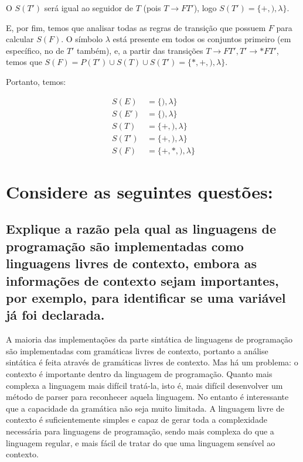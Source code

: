 \documentclass{article}
\begin{document}
O $S(T')$ será igual ao seguidor de $T$ (pois $T \rightarrow FT'$), logo $S(T') = \{+, ), \lambda\}$.

E, por fim, temos que analisar todas as regras de transição que possuem $F$ para calcular $S(F)$. O símbolo $\lambda$ está presente em todos os conjuntos primeiro (em específico, no de $T'$ também), e, a partir das transições $T \rightarrow FT', T' \rightarrow *FT'$, temos que $S(F) = P(T') \cup S(T) \cup S(T') = \{*,+,),\lambda\}$.
	
Portanto, temos:

\begin{align*}
	S(E) &= \{ ), \lambda            \}\\
	S(E') &= \{  ), \lambda       \}\\
	S(T) &= \{ +, ), \lambda     \}\\
	S(T') &= \{   +, ), \lambda                    \}\\
	S(F) &= \{ +, *, ), \lambda      \}
\end{align*}

\newpage
\section{Considere as seguintes questões:}

\subsection{Explique a razão pela qual as linguagens de programação são implementadas como linguagens
livres de contexto, embora as informações de contexto sejam importantes, por exemplo, para
identificar se uma variável já foi declarada.}

A maioria das implementações da parte sintática de linguagens de programação são implementadas com gramáticas livres de contexto, portanto a análise sintática é feita através de gramáticas livres de contexto. Mas há um problema: o contexto é importante dentro da linguagem de programação. Quanto mais complexa a linguagem mais difícil tratá-la, isto é, mais difícil desenvolver um método de parser para reconhecer aquela linguagem. No entanto é interessante que a capacidade da gramática não seja muito limitada. A linguagem livre de contexto é suficientemente simples e capaz de gerar toda a complexidade necessária para linguagens de programação, sendo mais complexa do que a linguagem regular, e mais fácil de tratar do que uma linguagem sensível ao contexto. 
\end{document}
